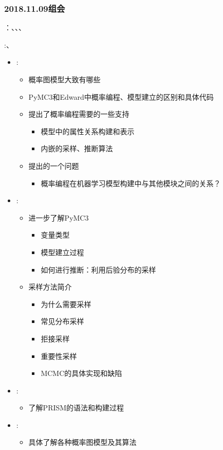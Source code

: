 \subsubsection{2018.11.09组会}
\label{sec:g2018:1026}
：\RenZH、\TangLT、\ZY、\ZhangYX

:\TangLT、\ZY

\begin{itemize}
\item \RenZH:
    \begin{itemize}
        \item 概率图模型大致有哪些
        \item PyMC3和Edward中概率编程、模型建立的区别和具体代码
        \item 提出了概率编程需要的一些支持
            \begin{itemize}
        		\item 模型中的属性关系构建和表示
       		 \item 内嵌的采样、推断算法
   	    \end{itemize}
        \item 提出的一个问题
            \begin{itemize}
                \item 概率编程在机器学习模型构建中与其他模块之间的关系？
            \end{itemize}
    \end{itemize}
\item \TangLT:
    \begin{itemize}
        \item 进一步了解PyMC3
        \begin{itemize}
        	\item 变量类型
       		 \item 模型建立过程
		 \item 如何进行推断：利用后验分布的采样
   	    \end{itemize}
        \item 采样方法简介
        \begin{itemize}
        	\item 为什么需要采样
       		 \item 常见分布采样
		 \item 拒接采样
		 \item 重要性采样
		 \item MCMC的具体实现和缺陷
   	    \end{itemize}
    \end{itemize}
\end{itemize}

\begin{itemize}
\item \RenZH:
    \begin{itemize}
    	\item 了解PRISM的语法和构建过程
     \end{itemize}
\item \TangLT:
    \begin{itemize}
        \item 具体了解各种概率图模型及其算法
    \end{itemize}
\end{itemize}
